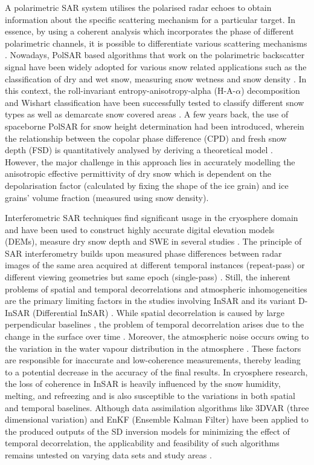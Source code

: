 \documentclass[review]{elsarticle}
\begin{document}
A polarimetric SAR system utilises the polarised radar echoes to obtain information about the specific scattering mechanism for a particular target. In essence, by using a coherent analysis which incorporates the phase of different polarimetric channels, it is possible to differentiate various scattering mechanisms \citep{Lee2009}. Nowadays, PolSAR based algorithms that work on the polarimetric backscatter signal have been widely adopted for various snow related applications such as the classification of dry and wet snow, measuring snow wetness and snow density \citep{Singh2017, Snehmani2010, Thakur2012, Thakur2017, Usami2016}. In this context, the roll-invariant entropy-anisotropy-alpha (H-A-$\alpha$) decomposition and Wishart classification have been successfully tested to classify different snow types as well as demarcate snow covered areas \citep{Cloude2010,Lee2009,Singh2014}. A few years back, the use of spaceborne PolSAR for snow height determination had been introduced, wherein the relationship between the copolar phase difference (CPD) and fresh snow depth (FSD) is quantitatively analysed by deriving a theoretical model \citep{Leinss2014}. However, the major challenge in this approach lies in accurately modelling the anisotropic effective permittivity of dry snow which is dependent on the depolarisation factor (calculated by fixing the shape of the ice grain) and ice grains’ volume fraction (measured using snow density).

Interferometric SAR techniques find significant usage in the cryosphere domain and have been used to construct highly accurate digital elevation models (DEMs), measure dry snow depth and SWE in several studies \citep{Guneriussen2001, Lei2016, Leinss2015, Li2017, Liu2017}. The principle of SAR interferometry builds upon measured phase differences between radar images of the same area acquired at different temporal instances (repeat-pass) or different viewing geometries but same epoch (single-pass) \citep{Hanssen2001}. Still, the inherent problems of spatial and temporal decorrelations and atmospheric inhomogeneities are the primary limiting factors in the studies involving InSAR and its variant D-InSAR (Differential InSAR) \citep{Pepe2017}. While spatial decorrelation is caused by large perpendicular baselines \citep{Pepe2017}, the problem of temporal decorrelation arises due to the change in the surface over time \citep{Leinss2018, Leinss2015}. Moreover, the atmospheric noise occurs owing to the variation in the water vapour distribution in the atmosphere \citep{Hanssen2001}. These factors are responsible for inaccurate and low-coherence measurements, thereby leading to a potential decrease in the accuracy of the final results. In cryosphere research, the loss of coherence in InSAR is heavily influenced by the snow humidity, melting, and refreezing and is also susceptible to the variations in both spatial and temporal baselines. Although data assimilation algorithms like 3DVAR (three dimensional variation) and EnKF (Ensemble Kalman Filter) have been applied to the produced outputs of the SD inversion models for minimizing the effect of temporal decorrelation, the applicability and feasibility of such algorithms remains untested on varying data sets and study areas \citep{Liu2017}.
\end{document}
